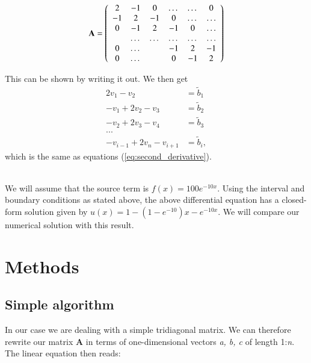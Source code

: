 \documentclass{article}
\begin{document}
\begin{multicols}{2}
\begin{equation}
    {\bf A} = \left(\begin{array}{cccccc}
                           2& -1& 0 &\dots   & \dots &0 \\
                           -1 & 2 & -1 &0 &\dots &\dots \\
                           0&-1 &2 & -1 & 0 & \dots \\
                           & \dots   & \dots &\dots   &\dots & \dots \\
                           0&\dots   &  &-1 &2& -1 \\
                           0&\dots    &  & 0  &-1 & 2 \\
                      \end{array} \right)
\end{equation}

\noindent This can be shown by writing it out. We then get
\begin{align}
	2v_1 - v_2 &= \tilde{b}_1 \\
	-v_1 + 2v_2 - v_3 &= \tilde{b}_2 \\
	-v_2 + 2v_3 - v_4 &= \tilde{b}_3 \\
	... \\
	-v_{i-1} + 2v_n - v_{i+1} &= \tilde{b}_i,
\end{align}
which is the same as equations (\ref{eq:second_derivative}).

\\
\noindent We will assume that the source term is $f(x) = 100e^{-10x}$. Using the interval and boundary conditions as stated above, the above differential equation has a closed-form  solution given by $u(x) = 1-(1-e^{-10})x-e^{-10x}$. We will compare our numerical solution with this result. 





\section{Methods}
\subsection{Simple algorithm}
In our case we are dealing with a simple tridiagonal matrix. We can therefore rewrite our matrix \textbf{A} in terms of one-dimensional vectors \textit{a, b, c} of length 1:\textit{n}. The linear equation then reads:


\end{multicols}
\end{document}
